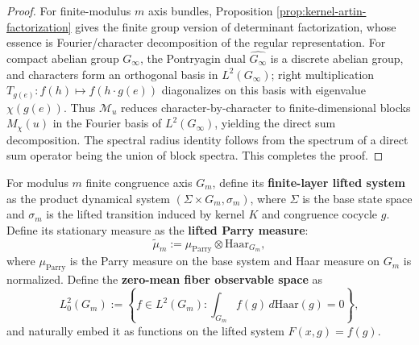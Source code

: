 \begin{proof}
For finite-modulus \(m\) axis bundles, Proposition \ref{prop:kernel-artin-factorization} gives the finite group version of determinant factorization, whose essence is Fourier/character decomposition of the regular representation.
For compact abelian group \(G_\infty\), the Pontryagin dual \(\widehat{G_\infty}\) is a discrete abelian group, and characters form an orthogonal basis in \(L^2(G_\infty)\); right multiplication \(T_{g(e)}:f(h)\mapsto f(h\cdot g(e))\) diagonalizes on this basis with eigenvalue \(\chi(g(e))\).
Thus \(\mathcal{M}_u\) reduces character-by-character to finite-dimensional blocks \(M_\chi(u)\) in the Fourier basis of \(L^2(G_\infty)\), yielding the direct sum decomposition. The spectral radius identity follows from the spectrum of a direct sum operator being the union of block spectra. This completes the proof.
\end{proof}

\begin{definition}\label{def:pom-lifted-system-m}
For modulus $m$ finite congruence axis $G_m$, define its \textbf{finite-layer lifted system} as the product dynamical system $(\Sigma \times G_m, \sigma_m)$, where $\Sigma$ is the base state space and $\sigma_m$ is the lifted transition induced by kernel $K$ and congruence cocycle $g$.
Define its stationary measure as the \textbf{lifted Parry measure}:
\[
\widetilde\mu_m := \mu_{\mathrm{Parry}} \otimes \mathrm{Haar}_{G_m},
\]
where $\mu_{\mathrm{Parry}}$ is the Parry measure on the base system and Haar measure on $G_m$ is normalized.
Define the \textbf{zero-mean fiber observable space} as
\[
L^2_0(G_m) := \left\{ f \in L^2(G_m) : \int_{G_m} f(g) \, d\mathrm{Haar}(g) = 0 \right\},
\]
and naturally embed it as functions on the lifted system $F(x, g) = f(g)$.
\end{definition}

